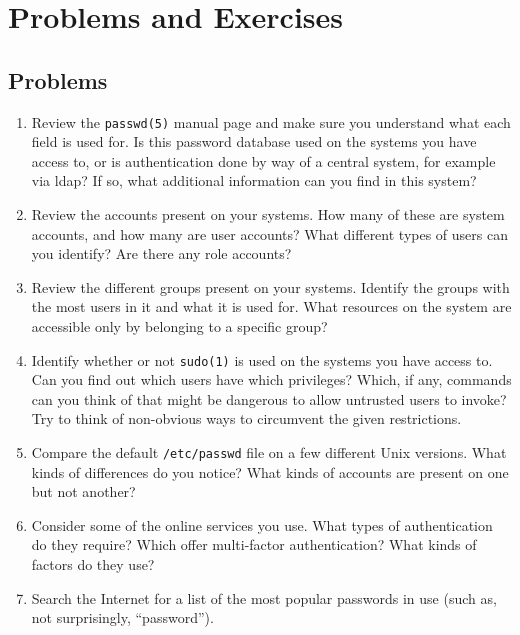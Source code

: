 \vfill
\pagebreak

\chapter*{Problems and Exercises}
\section*{Problems}

\begin{enumerate}

\item Review the {\tt passwd(5)} manual page and make sure you understand
what each field is used for.  Is this password
database used on the systems you have access to, or is
authentication done by way of a central system, for
example via \gls{ldap}?  If so, what additional
information can you find in this system?

\item
Review the accounts present on your systems.  How many
of these are system accounts, and how many are user
accounts?  What different types of users can you
identify?  Are there any role accounts?

\item
Review the different groups present on your systems.
Identify the groups with the most users in it and what
it is used for.  What resources on the system are
accessible only by belonging to a specific group?

\item
Identify whether or not {\tt sudo(1)} is used on the
systems you have access to.  Can you find out which
users have which privileges?  Which, if any, commands
can you think of that might be dangerous to allow
untrusted users to invoke?  Try to think of
non-obvious ways to circumvent the given restrictions.

\item
Compare the default {\tt /etc/passwd} file on a few
different Unix versions.  What kinds of differences do
you notice?  What kinds of accounts are present on one
but not another?

\item
Consider some of the online services you use.  What
types of authentication do they require?  Which offer
multi-factor authentication?  What kinds of factors do
they use?

\item
Search the Internet for a list of the most popular
passwords in use (such as, not surprisingly,
``password'').


\end{enumerate}
